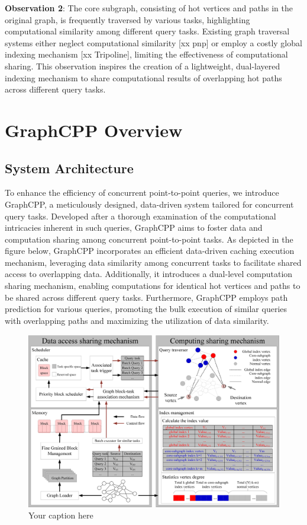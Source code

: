 \documentclass[lettersize,journal]{IEEEtran} %
\begin{document}
{\bf{Observation 2}}: The core subgraph, consisting of hot vertices and paths in the original graph, is frequently traversed by various tasks, highlighting computational similarity among different query tasks. Existing graph traversal systems either neglect computational similarity [xx pnp] or employ a costly global indexing mechanism [xx Tripoline], limiting the effectiveness of computational sharing. This observation inspires the creation of a lightweight, dual-layered indexing mechanism to share computational results of overlapping hot paths across different query tasks. 

\section{GraphCPP Overview}

\subsection{System Architecture}
To enhance the efficiency of concurrent point-to-point queries, we introduce GraphCPP, a meticulously designed, data-driven system tailored for concurrent query tasks. Developed after a thorough examination of the computational intricacies inherent in such queries, GraphCPP aims to foster data and computation sharing among concurrent point-to-point tasks. As depicted in the figure below, GraphCPP incorporates an efficient data-driven caching execution mechanism, leveraging data similarity among concurrent tasks to facilitate shared access to overlapping data. Additionally, it introduces a dual-level computation sharing mechanism, enabling computations for identical hot vertices and paths to be shared across different query tasks. Furthermore, GraphCPP employs path prediction for various queries, promoting the bulk execution of similar queries with overlapping paths and maximizing the utilization of data similarity. 

\begin{figure}[!t]
    \centering
    \includegraphics[width=\columnwidth]{系统架构.png}
    \caption{Your caption here}
    \label{fig:系统架构}
  \end{figure}
  
\end{document}

